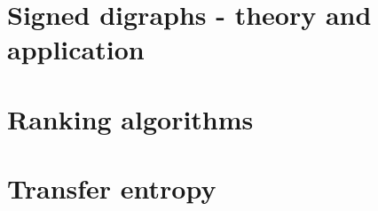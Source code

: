 \documentclass{article}
\begin{document}
\section{Signed digraphs - theory and application}


\section{Ranking algorithms}


\section{Transfer entropy}
\end{document}
